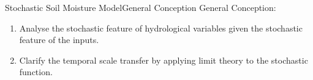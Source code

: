 \documentclass[10pt]{beamer}
\begin{document}

\begin{frame}{Stochastic Soil Moisture Model}{General Conception} 
\textcolor[rgb]{1,0,0}{General Conception:}
\begin{enumerate}
\item Analyse the stochastic feature of hydrological variables given the stochastic feature of the inputs.
\item Clarify the temporal scale transfer by applying limit theory to the stochastic function.
\end{enumerate}

 \begin{table}[H] 
\end{table}
 
\end{frame}
\end{document}
